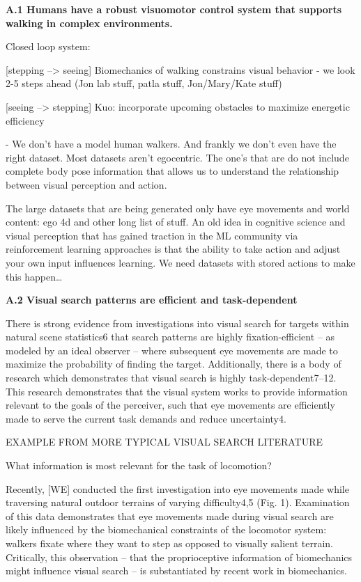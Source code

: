 
\textbf{A.1 Humans have a robust visuomotor control system that supports walking in complex environments.}

Closed loop system:

[stepping --> seeing] Biomechanics of walking constrains visual behavior 
- we look 2-5 steps ahead (Jon lab stuff, patla stuff, Jon/Mary/Kate stuff)

[seeing --> stepping] 
Kuo: incorporate upcoming obstacles to maximize energetic efficiency

- We don't have a model human walkers. And frankly we don't even have the right dataset.  Most datasets aren't egocentric.  The one's that are do not include complete body pose information that allows us to understand the relationship between visual perception and action.

The large datasets that are being generated only have eye movements and
world content: ego 4d and other long list of stuff. An old idea in
cognitive science and visual perception that has gained traction in the
ML community via reinforcement learning approaches is that the ability
to take action and adjust your own input influences learning. We need
datasets with stored actions to make this happen\ldots{}


\textbf{A.2 Visual search patterns are efficient and task-dependent}

There is strong evidence from investigations into visual search for targets within natural scene statistics6 that search patterns are highly fixation-efficient – as modeled by an ideal observer – where subsequent eye movements are made to maximize the probability of finding the target. Additionally, there is a body of research which demonstrates that visual search is highly task-dependent7–12. This research demonstrates that the visual system works to provide information relevant to the goals of the perceiver, such that eye movements are efficiently made to serve the current task demands and reduce uncertainty4. 

EXAMPLE FROM MORE TYPICAL VISUAL SEARCH LITERATURE

What information is most relevant for the task of locomotion?

Recently, [WE] conducted the first investigation into eye movements made while traversing natural outdoor terrains of varying difficulty4,5 (Fig. 1). Examination of this data demonstrates that eye movements made during visual search are likely influenced by the biomechanical constraints of the locomotor system: walkers fixate where they want to step as opposed to visually salient terrain. Critically, this observation – that the proprioceptive information of biomechanics might influence visual search – is substantiated by recent work in biomechanics.

